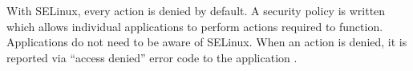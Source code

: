 With SELinux, every action is denied by default. A security policy is written
which allows individual applications to perform actions required to function.
Applications do not need to be aware of SELinux. When an action is denied, it is
reported via ``access denied'' error code to the application \cite{centoshowto}.

%
%    
%
%

